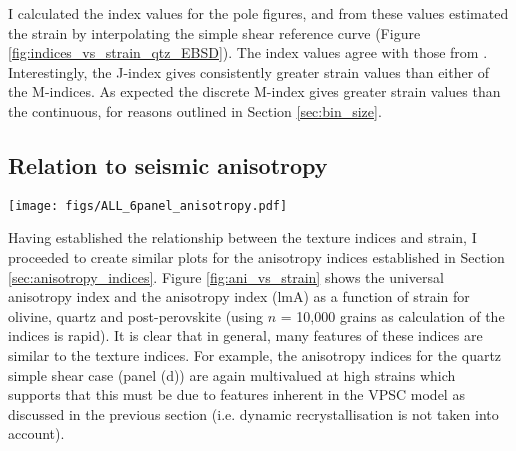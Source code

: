 \documentclass[a4paper,12pt,twoside]{report}
\numberwithin{equation}{chapter}
\begin{document}
I calculated the index values for the pole figures, and from these values estimated the strain by interpolating the simple shear reference curve (Figure \ref{fig:indices_vs_strain_qtz_EBSD}). The index values agree with those from \cite{ParsonsThesis}. Interestingly, the J-index gives consistently greater strain values than either of the M-indices. As expected the discrete M-index gives greater strain values than the continuous, for reasons outlined in Section \ref{sec:bin_size}.  

\subsection{Relation to seismic anisotropy}


\begin{figure*}[p]
  \centering
    \texttt{[image: figs/ALL\_6panel\_anisotropy.pdf]}
  \caption[Anisotropy measures and strain]{Seismic anisotropy measures, the Universal Elastic Anisotropy Index (uA) and the \cite{Ledbetter2006} index (lmA) against strain. \textbf{Top row} shows data from olivine VPSC models, \textbf{middle row} shows quartz, and \textbf{bottom row} shows post-perovskite. \textbf{Right column} shows data from axial compression models and \textbf{left column} shows data from simple shear models. All calculations use $n$ = 10,000 grains.} 
  \label{fig:ani_vs_strain}
\end{figure*} 

Having established the relationship between the texture indices and strain, I proceeded to create similar plots for the anisotropy indices established in Section \ref{sec:anisotropy_indices}. Figure \ref{fig:ani_vs_strain} shows the universal anisotropy index \citep[uA,][]{Ranganathan2008} and the \cite{Ledbetter2006} anisotropy index (lmA) as a function of strain for olivine, quartz and post-perovskite (using $n$ = 10,000 grains as calculation of the indices is rapid). It is clear that in general, many features of these indices are similar to the texture indices. For example, the anisotropy indices for the quartz simple shear case (panel (d)) are again multivalued at high strains which supports that this must be due to features inherent in the VPSC model as discussed in the previous section (i.e. dynamic recrystallisation is not taken into account).    
\end{document}
